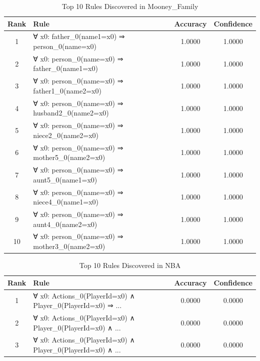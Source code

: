 \documentclass[11pt,a4paper]{article}
\begin{document}
\begin{table}[h!]
\centering
\small
\caption{Top 10 Rules Discovered in Mooney_Family}
\label{tab:rules_MooneyFamily}
\begin{tabular}{|c|p{5cm}|c|c|}
\hline
\textbf{Rank} & \textbf{Rule} & \textbf{Accuracy} & \textbf{Confidence} \\
\hline
1 & ∀ x0: father\_0(name1=x0) ⇒ person\_0(name=x0) & 1.0000 & 1.0000 \\
2 & ∀ x0: person\_0(name=x0) ⇒ father\_0(name1=x0) & 1.0000 & 1.0000 \\
3 & ∀ x0: person\_0(name=x0) ⇒ father1\_0(name2=x0) & 1.0000 & 1.0000 \\
4 & ∀ x0: person\_0(name=x0) ⇒ husband2\_0(name2=x0) & 1.0000 & 1.0000 \\
5 & ∀ x0: person\_0(name=x0) ⇒ niece2\_0(name2=x0) & 1.0000 & 1.0000 \\
6 & ∀ x0: person\_0(name=x0) ⇒ mother5\_0(name2=x0) & 1.0000 & 1.0000 \\
7 & ∀ x0: person\_0(name=x0) ⇒ aunt5\_0(name1=x0) & 1.0000 & 1.0000 \\
8 & ∀ x0: person\_0(name=x0) ⇒ niece4\_0(name1=x0) & 1.0000 & 1.0000 \\
9 & ∀ x0: person\_0(name=x0) ⇒ aunt4\_0(name2=x0) & 1.0000 & 1.0000 \\
10 & ∀ x0: person\_0(name=x0) ⇒ mother3\_0(name2=x0) & 1.0000 & 1.0000 \\
\hline
\end{tabular}
\end{table}

\begin{table}[h!]
\centering
\small
\caption{Top 10 Rules Discovered in NBA}
\label{tab:rules_NBA}
\begin{tabular}{|c|p{5cm}|c|c|}
\hline
\textbf{Rank} & \textbf{Rule} & \textbf{Accuracy} & \textbf{Confidence} \\
\hline
1 & ∀ x0: Actions\_0(PlayerId=x0) ∧ Player\_0(PlayerId=x0) ⇒ ... & 0.0000 & 0.0000 \\
2 & ∀ x0: Actions\_0(PlayerId=x0) ∧ Player\_0(PlayerId=x0) ∧ ... & 0.0000 & 0.0000 \\
3 & ∀ x0: Actions\_0(PlayerId=x0) ∧ Player\_0(PlayerId=x0) ∧ ... & 0.0000 & 0.0000 \\
\hline
\end{tabular}
\end{table}
\end{document}
